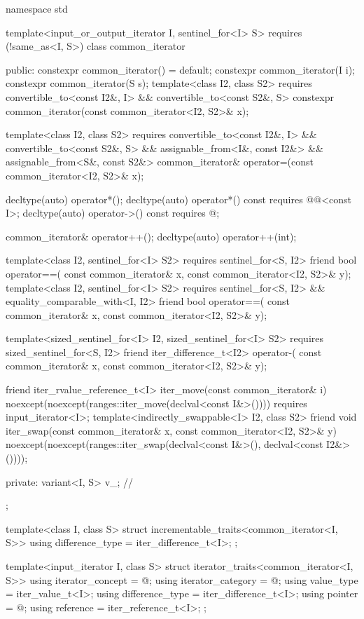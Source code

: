 %
\begin{codeblock}
namespace std {
  template<input_or_output_iterator I, sentinel_for<I> S>
    requires (!same_as<I, S>)
  class common_iterator {
  public:
    constexpr common_iterator() = default;
    constexpr common_iterator(I i);
    constexpr common_iterator(S s);
    template<class I2, class S2>
      requires convertible_to<const I2&, I> && convertible_to<const S2&, S>
        constexpr common_iterator(const common_iterator<I2, S2>& x);

    template<class I2, class S2>
      requires convertible_to<const I2&, I> && convertible_to<const S2&, S> &&
               assignable_from<I&, const I2&> && assignable_from<S&, const S2&>
        common_iterator& operator=(const common_iterator<I2, S2>& x);

    decltype(auto) operator*();
    decltype(auto) operator*() const
      requires @@<const I>;
    decltype(auto) operator->() const
      requires @\seebelow@;

    common_iterator& operator++();
    decltype(auto) operator++(int);

    template<class I2, sentinel_for<I> S2>
      requires sentinel_for<S, I2>
    friend bool operator==(
      const common_iterator& x, const common_iterator<I2, S2>& y);
    template<class I2, sentinel_for<I> S2>
      requires sentinel_for<S, I2> && equality_comparable_with<I, I2>
    friend bool operator==(
      const common_iterator& x, const common_iterator<I2, S2>& y);

    template<sized_sentinel_for<I> I2, sized_sentinel_for<I> S2>
      requires sized_sentinel_for<S, I2>
    friend iter_difference_t<I2> operator-(
      const common_iterator& x, const common_iterator<I2, S2>& y);

    friend iter_rvalue_reference_t<I> iter_move(const common_iterator& i)
      noexcept(noexcept(ranges::iter_move(declval<const I&>())))
        requires input_iterator<I>;
    template<indirectly_swappable<I> I2, class S2>
      friend void iter_swap(const common_iterator& x, const common_iterator<I2, S2>& y)
        noexcept(noexcept(ranges::iter_swap(declval<const I&>(), declval<const I2&>())));

  private:
    variant<I, S> v_;   // \expos
  };

  template<class I, class S>
  struct incrementable_traits<common_iterator<I, S>> {
    using difference_type = iter_difference_t<I>;
  };

  template<input_iterator I, class S>
  struct iterator_traits<common_iterator<I, S>> {
    using iterator_concept = @\seebelow@;
    using iterator_category = @\seebelow@;
    using value_type = iter_value_t<I>;
    using difference_type = iter_difference_t<I>;
    using pointer = @\seebelow@;
    using reference = iter_reference_t<I>;
  };
}
\end{codeblock}

